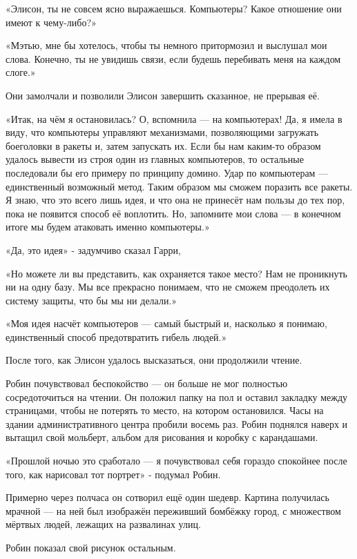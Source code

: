 \documentclass[a4paper,12pt]{book}
\begin{document}
\par
«Элисон, ты не совсем ясно выражаешься. Компьютеры? Какое отношение они имеют к чему-либо?»
\par
«Мэтью, мне бы хотелось, чтобы ты немного притормозил и выслушал мои слова. Конечно, ты не увидишь связи, если будешь перебивать меня на каждом слоге.»
\par
Они замолчали и позволили Элисон завершить сказанное, не прерывая её.
\par
«Итак, на чём я остановилась? О, вспомнила — на компьютерах! Да, я имела в виду, что компьютеры управляют механизмами, позволяющими загружать боеголовки в ракеты и, затем запускать их. Если бы нам каким-то образом удалось вывести из строя один из главных компьютеров, то остальные последовали бы его примеру по принципу домино. Удар по компьютерам — единственный возможный метод. Таким образом мы сможем поразить все ракеты. Я знаю, что это всего лишь идея, и что она не принесёт нам пользы до тех пор, пока не появится способ её воплотить. Но, запомните мои слова — в конечном итоге мы будем атаковать именно компьютеры.»
\par
«Да, это идея» - задумчиво сказал Гарри,
\par
«Но можете ли вы представить, как охраняется такое место? Нам не проникнуть ни на одну базу. Мы все прекрасно понимаем, что не сможем преодолеть их систему защиты, что бы мы ни делали.»
\par
«Моя идея насчёт компьютеров — самый быстрый и, насколько я понимаю, единственный способ предотвратить гибель людей.»
\par
После того, как Элисон удалось высказаться, они продолжили чтение.
\par
Робин почувствовал беспокойство — он больше не мог полностью сосредоточиться на чтении. Он положил папку на пол и оставил закладку между страницами, чтобы не потерять то место, на котором остановился. Часы на здании административного центра пробили восемь раз. Робин поднялся наверх и вытащил свой мольберт, альбом для рисования и коробку с карандашами.
\par
«Прошлой ночью это сработало — я почувствовал себя гораздо спокойнее после того, как нарисовал тот портрет» - подумал Робин.
\par
Примерно через полчаса он сотворил ещё один шедевр. Картина получилась мрачной — на ней был изображён переживший бомбёжку город, с множеством мёртвых людей, лежащих на развалинах улиц.\\
\par
Робин показал свой рисунок остальным.
\end{document}
